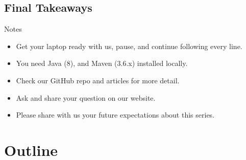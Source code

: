 \documentclass[aspectratio=169]{beamer}
\begin{document}
    \subsection{Final Takeaways}\label{subsec:final-takeaways}
    \begin{frame}{Notes}
        \begin{itemize}[<+- | alert@+>]
            \item Get your laptop ready with us, pause, and continue following every line.
            \item You need Java (8), and Maven (3.6.x) installed locally.
            \item Check our GitHub repo and articles for more detail.
            \item Ask and share your question on our website.
            \item Please share with us your future expectations about this series.
        \end{itemize}
    \end{frame}




    \section{Outline}\label{sec:outline}
\end{document}
